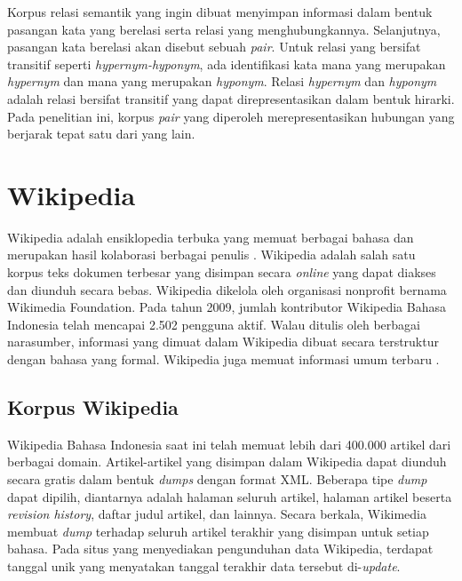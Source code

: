 Korpus relasi semantik yang ingin dibuat menyimpan informasi dalam bentuk pasangan kata yang berelasi serta relasi yang menghubungkannya. Selanjutnya, pasangan kata berelasi akan disebut sebuah \textit{pair}. Untuk relasi yang bersifat transitif seperti \textit{hypernym-hyponym}, ada identifikasi kata mana yang merupakan \textit{hypernym} dan mana yang merupakan \textit{hyponym}. Relasi \textit{hypernym} dan \textit{hyponym} adalah relasi bersifat transitif yang dapat direpresentasikan dalam bentuk hirarki. Pada penelitian ini, korpus \textit{pair} yang diperoleh merepresentasikan hubungan yang berjarak tepat satu dari yang lain. 


\section{Wikipedia}
Wikipedia adalah ensiklopedia terbuka yang memuat berbagai bahasa dan merupakan hasil kolaborasi berbagai penulis \citep{denoyer2006wikipedia}. Wikipedia adalah salah satu korpus teks dokumen terbesar yang disimpan secara \textit{online} yang dapat diakses dan diunduh secara bebas. Wikipedia dikelola oleh organisasi nonprofit bernama Wikimedia Foundation. Pada tahun 2009, jumlah kontributor Wikipedia Bahasa Indonesia telah mencapai 2.502 pengguna aktif. Walau ditulis oleh berbagai narasumber, informasi yang dimuat dalam Wikipedia dibuat secara terstruktur dengan bahasa yang formal. Wikipedia juga memuat informasi umum terbaru \citep{arnold2014extracting}.

\subsection{Korpus Wikipedia}
Wikipedia Bahasa Indonesia saat ini telah memuat lebih dari 400.000 artikel dari berbagai domain. Artikel-artikel yang disimpan dalam Wikipedia dapat diunduh secara gratis dalam bentuk \textit{dumps} dengan format XML. Beberapa tipe \textit{dump} dapat dipilih, diantarnya adalah halaman seluruh artikel, halaman artikel beserta \textit{revision history}, daftar judul artikel, dan lainnya. Secara berkala, Wikimedia membuat \textit{dump} terhadap seluruh artikel terakhir yang disimpan untuk setiap bahasa. Pada situs yang menyediakan pengunduhan data Wikipedia, terdapat tanggal unik yang menyatakan tanggal terakhir data tersebut di-\textit{update}.

